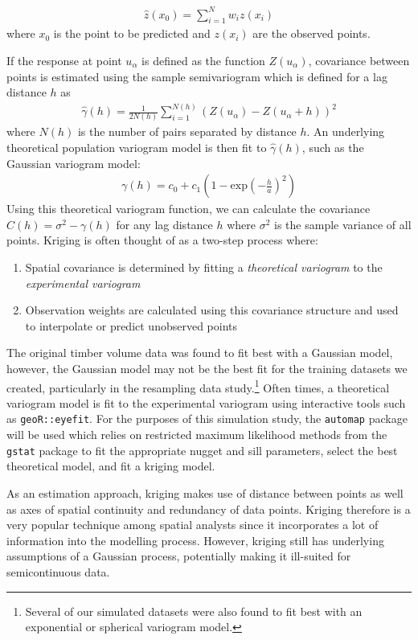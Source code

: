 \documentclass{article}
\begin{document}
\begin{align*}
	\hat{z}(x_0) = \sum_{i=1}^{N} w_i z(x_i)
\end{align*}
where $x_0$ is the point to be predicted and $z(x_i)$ are the observed points.

If the response at point $u_\alpha$ is defined as the function $Z(u_\alpha)$, covariance between points is estimated using the sample semivariogram which is defined for a lag distance $h$ as
\begin{align*}
	\hat{\gamma}(h) = \frac{1}{2 N(h)} \sum_{i=1}^{N(h)} (Z(u_{\alpha}) - Z(u_{\alpha} + h))^2
\end{align*}
where $N(h)$ is the number of pairs separated by distance $h$.
An underlying theoretical population variogram model is then fit to $\hat{\gamma}(h)$, such as the Gaussian variogram model:
\begin{align*}
	\gamma(h) = c_0 + c_1 \left( 1 - \text{exp}\left(-\frac{h}{a}\right)^2\right)
\end{align*}
Using this theoretical variogram function, we can calculate the covariance $C(h) = \sigma^2 - \gamma(h)$ for any lag distance $h$ where $\sigma^2$ is the sample variance of all points. Kriging is often thought of as a two-step process where:
\begin{enumerate}
	\item Spatial covariance is determined by fitting a \textit{theoretical variogram} to the \textit{experimental variogram}
	\item Observation weights are calculated using this covariance structure and used to interpolate or predict unobserved points
\end{enumerate}

The original timber volume data was found to fit best with a Gaussian model, however, the Gaussian model may not be the best fit for the training datasets we created, particularly in the resampling data study.\footnote{Several of our simulated datasets were also found to fit best with an exponential or spherical variogram model.}
Often times, a theoretical variogram model is fit to the experimental variogram using interactive tools such as \texttt{geoR::eyefit}. 
For the purposes of this simulation study, the \texttt{automap} package will be used which relies on restricted maximum likelihood methods from the \texttt{gstat} package to fit the appropriate nugget and sill parameters, select the best theoretical model, and fit a kriging model.

As an estimation approach, kriging makes use of distance between points as well as axes of spatial continuity and redundancy of data points.
Kriging therefore is a very popular technique among spatial analysts since it incorporates a lot of information into the modelling process.
However, kriging still has underlying assumptions of a Gaussian process, potentially making it ill-suited for semicontinuous data.
\end{document}
